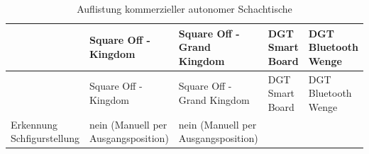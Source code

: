 \begin{longtable}[]{@{}lllll@{}}
\caption{Auflistung kommerzieller autonomer Schachtische}\tabularnewline
\toprule
\begin{minipage}[b]{0.18\columnwidth}\raggedright
\strut
\end{minipage} & \begin{minipage}[b]{0.18\columnwidth}\raggedright
Square Off - Kingdom \cite{squareoffkingdom}\strut
\end{minipage} & \begin{minipage}[b]{0.22\columnwidth}\raggedright
Square Off - Grand Kingdom \cite{squareoffgrand}\strut
\end{minipage} & \begin{minipage}[b]{0.15\columnwidth}\raggedright
DGT Smart Board \cite{dtgsmartboard}\strut
\end{minipage} & \begin{minipage}[b]{0.13\columnwidth}\raggedright
DGT Bluetooth Wenge \cite{dtgble}\strut
\end{minipage}\tabularnewline
\midrule
\endfirsthead
\toprule
\begin{minipage}[b]{0.18\columnwidth}\raggedright
\strut
\end{minipage} & \begin{minipage}[b]{0.18\columnwidth}\raggedright
Square Off - Kingdom \cite{squareoffkingdom}\strut
\end{minipage} & \begin{minipage}[b]{0.22\columnwidth}\raggedright
Square Off - Grand Kingdom \cite{squareoffgrand}\strut
\end{minipage} & \begin{minipage}[b]{0.15\columnwidth}\raggedright
DGT Smart Board \cite{dtgsmartboard}\strut
\end{minipage} & \begin{minipage}[b]{0.13\columnwidth}\raggedright
DGT Bluetooth Wenge \cite{dtgble}\strut
\end{minipage}\tabularnewline
\midrule
\endhead
\begin{minipage}[t]{0.18\columnwidth}\raggedright
Erkennung Schfigurstellung\strut
\end{minipage} & \begin{minipage}[t]{0.18\columnwidth}\raggedright
nein (Manuell per Ausgangsposition)\strut
\end{minipage} & \begin{minipage}[t]{0.22\columnwidth}\raggedright
nein (Manuell per Ausgangsposition)\strut
\end{minipage} & \begin{minipage}[t]{0.15\columnwidth}\raggedright

\end{minipage}
\end{longtable}
